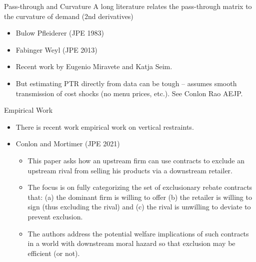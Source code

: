 \begin{frame}{Pass-through and Curvature}
A long literature relates the pass-through matrix to the curvature of demand (2nd derivatives)
\begin{itemize}
\item Bulow Pfleiderer (JPE 1983)
\item Fabinger Weyl (JPE 2013)
\item Recent work by Eugenio Miravete and Katja Seim.
\item But estimating PTR directly from data can be tough -- assumes smooth transmission of cost shocks (no menu prices, etc.). See Conlon Rao AEJP.
  \end{itemize}
\end{frame}




\begin{frame}{Empirical Work}
\begin{itemize}
\item There is recent work empirical work on \alert{vertical restraints}.
\item Conlon and Mortimer (JPE 2021)
\begin{itemize}
\item This paper asks how an \alert{upstream firm} can use contracts to \alert{exclude} an upstream rival from selling his products via a downstream retailer.
\item The focus is on fully categorizing the set of exclusionary rebate contracts that: (a) the dominant firm is willing to offer (b) the retailer is willing to sign (thus excluding the rival) and (c) the rival is unwilling to deviate to prevent exclusion.
\item The authors address the potential welfare implications of such contracts in a world with \alert{downstream moral hazard} so that exclusion may be efficient (or not).
\end{itemize}
\end{itemize}
\end{frame}


